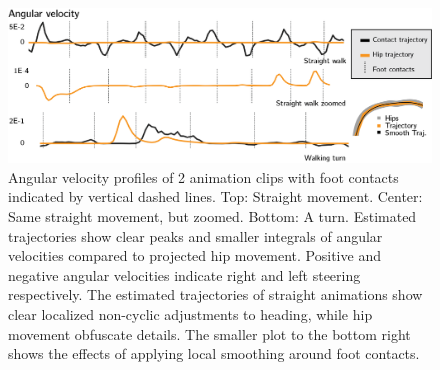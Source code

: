 \begin{figure}
    \centering
    \includegraphics[width=1.0\columnwidth]{img/estimated_trajectory_angular_velocity.png}
    \caption{Angular velocity profiles of 2 animation clips with foot contacts indicated by vertical dashed lines. Top: Straight movement. Center: Same straight movement, but zoomed. Bottom: A turn. Estimated trajectories show clear peaks and smaller integrals of angular velocities compared to projected hip movement. Positive and negative angular velocities indicate right and left steering respectively. The estimated trajectories of straight animations show clear localized non-cyclic adjustments to heading, while hip movement obfuscate details.
    The smaller plot to the bottom right shows the effects of applying local smoothing around foot contacts.}
    \label{fig:results:estimatedtrajectory:stats}
\end{figure}


